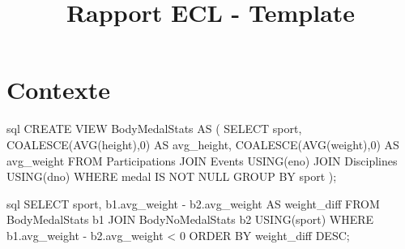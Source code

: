 \documentclass{mytex}
\title{Rapport ECL - Template} %
\begin{document}
	
	
	
	
	
	
	\fairemarges %
	\fairepagedegarde %
	\tabledematieres %
	
	
	\section{Contexte} 
	
	\begin{codeboxlang}[title=Physique des médaillés par sport]{sql}
		CREATE VIEW BodyMedalStats AS (
		SELECT sport, COALESCE(AVG(height),0) AS avg_height, COALESCE(AVG(weight),0) AS avg_weight
		FROM Participations
		JOIN Events USING(eno)
		JOIN Disciplines USING(dno)
		WHERE medal IS NOT NULL
		GROUP BY sport
		);
	\end{codeboxlang}
	
	
	
	\begin{codeboxlang}[title=]{sql}
		SELECT sport, b1.avg_weight - b2.avg_weight AS weight_diff
		FROM BodyMedalStats b1
		JOIN BodyNoMedalStats b2 USING(sport) 
		WHERE b1.avg_weight - b2.avg_weight < 0
		ORDER BY weight_diff DESC;
	\end{codeboxlang}
	
	\merci
	
\end{document}
